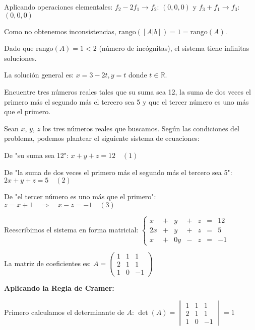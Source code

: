 \begin{prob}
\begin{enumerate}[$a)$]
\begin{myproof}
Aplicando operaciones elementales: $f_2 - 2f_1 \rightarrow f_2$: $(0, 0, 0)$ y $f_3 + f_1 \rightarrow f_3$: $(0, 0, 0)$

Como no obtenemos inconsistencias, $\text{rango}([A|b]) = 1 = \text{rango}(A)$.

Dado que $\text{rango}(A) = 1 < 2$ (número de incógnitas), el sistema tiene infinitas soluciones.

La solución general es: $x = 3 - 2t, y = t$ donde $t \in \mathbb{R}$.
\end{myproof}

\end{enumerate}
\end{prob}

\begin{prob} 
Encuentre tres números reales tales que su suma sea 12, la suma de dos veces el primero más el segundo más el tercero sea 5 y que el tercer número es uno más que el primero.  

\begin{myproof} 
Sean $x$, $y$, $z$ los tres números reales que buscamos. Según las condiciones del problema, podemos plantear el siguiente sistema de ecuaciones:

De "su suma sea 12": $x + y + z = 12 \quad (1)$

De "la suma de dos veces el primero más el segundo más el tercero sea 5": $2x + y + z = 5 \quad (2)$

De "el tercer número es uno más que el primero": $z = x + 1 \quad \Rightarrow \quad x - z = -1 \quad (3)$

Reescribimos el sistema en forma matricial:
$\left\lbrace \begin{array}{ccccccc}
x & + & y & + & z & = & 12 \\
2x & + & y & + & z & = & 5 \\
x & + & 0y & - & z & = & -1
\end{array} \right.$

La matriz de coeficientes es:
$A = \begin{pmatrix}
1 & 1 & 1 \\
2 & 1 & 1 \\
1 & 0 & -1
\end{pmatrix}$

\textbf{Aplicando la Regla de Cramer:}

Primero calculamos el determinante de $A$:
$\det(A) = \begin{vmatrix}
1 & 1 & 1 \\
2 & 1 & 1 \\
1 & 0 & -1
\end{vmatrix} = 1$


\end{myproof}
\end{prob}
